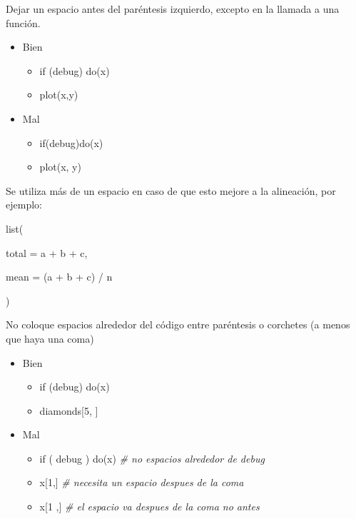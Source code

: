 \begin{enumerate}
Dejar un espacio antes del par\'entesis izquierdo, excepto en la llamada a una funci\'on.

\begin{itemize}
\item Bien  
\begin{itemize}
     \item if (debug) do(x)
     \item plot(x,y)
  \end{itemize}
\item Mal
   \begin{itemize}
      \item if(debug)do(x)
     \item plot(x, y)
   \end{itemize}
 \end{itemize}

Se utiliza más de un espacio en caso de que esto mejore a la alineaci\'on, por ejemplo:\\
\begin{list}{}{}
\item list(
    \begin{list}{}{} 
       \item total \hspace{3mm}= a + b + c,
       \item mean \hspace{2mm}= (a + b + c) / n
    \end{list}
\item )
\end{list}
No coloque espacios alrededor del c\'odigo entre par\'entesis o corchetes (a menos que haya una coma)
\begin{itemize}
\item Bien  
\begin{itemize}
     \item if (debug)  do(x)
     \item diamonds[5, ]
  \end{itemize}
\item Mal
   \begin{itemize}
      \item if ( debug ) do(x) \textit{\# no espacios alrededor de debug}
      \item x[1,] \textit{\# necesita un espacio despues de la coma}
      \item x[1 ,] \textit{\# el espacio va despues de la coma no antes}	   
\end{itemize}
 \end{itemize}


\end{enumerate}
